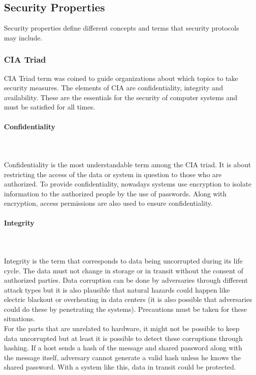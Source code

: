 \documentclass[a4paper, 12pt, titlepage]{article}
\begin{document}
\subsection{Security Properties}
Security properties define different concepts and terms that security protocols may include.
\subsubsection{CIA Triad}
CIA Triad term was coined to guide organizations about which topics to take security measures. The elements of CIA are confidentiality, integrity and availability. These are the essentials for the security of computer systems and must be satisfied for all times\cite{ciatriad}.
\paragraph{Confidentiality}\mbox{}\\
\\Confidentiality is the most understandable term among the CIA triad. It is about restricting the access of the data or system in question to those who are authorized\cite{ciatriad}. To provide confidentiality, nowadays systems use encryption to isolate information to the authorized people by the use of passwords. Along with encryption, access permissions are also used to ensure confidentiality\cite{confidentiality}. 
\paragraph{Integrity}\mbox{}\\
\\Integrity is the term that corresponds to data being uncorrupted during its life cycle. The data must not change in storage or in transit without the consent of authorized parties\cite{integrity}. Data corruption can be done by adversaries through different attack types but it is also plausible that natural hazards could happen like electric blackout or overheating in data centers (it is also possible that adversaries could do these by penetrating the systems)\cite{ciatriad}. Precautions must be taken for these situations.
\bigskip
\\For the parts that are unrelated to hardware, it might not be possible to keep data uncorrupted but at least it is possible to detect these corruptions through hashing. If a host sends a hash of the message and shared password along with the message itself, adversary cannot generate a valid hash unless he knows the shared password. With a system like this, data in transit could be protected.
\end{document}
